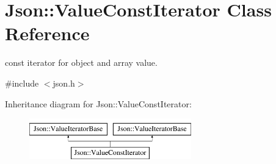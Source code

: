 \section{Json\+:\+:Value\+Const\+Iterator Class Reference}
\label{class_json_1_1_value_const_iterator}


const iterator for object and array value.  




{\ttfamily \#include $<$json.\+h$>$}

Inheritance diagram for Json\+:\+:Value\+Const\+Iterator\+:\begin{figure}[H]
\begin{center}
\leavevmode
\includegraphics[height=1.772152cm]{class_json_1_1_value_const_iterator}
\end{center}
\end{figure}
